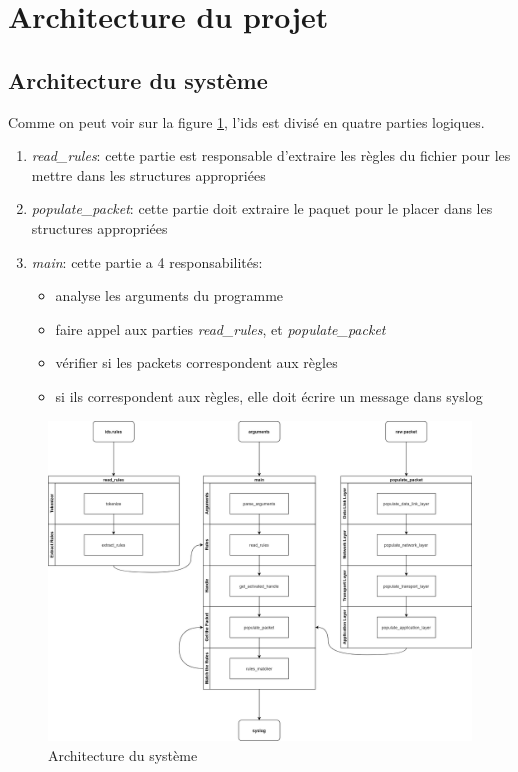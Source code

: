 \documentclass[a4paper]{article}
\begin{document}
\section{Architecture du projet}





\subsection{Architecture du système}



Comme on peut voir sur la figure \ref{fig:archsys}, l'ids est divisé en quatre parties logiques.
\begin{enumerate}
    \item \textit{read\_rules}: cette partie est responsable d'extraire les règles du fichier pour les mettre dans les structures appropriées
    \item \textit{populate\_packet}: cette partie doit extraire le paquet pour le placer dans les structures appropriées
    \item \textit{main}: cette partie a 4 responsabilités:
    \begin{itemize}
        \item analyse les arguments du programme
        \item faire appel aux parties \textit{read\_rules}, et \textit{populate\_packet}
        \item vérifier si les packets correspondent aux règles
        \item si ils correspondent aux règles, elle doit écrire un message dans syslog
    \end{itemize}
\end{enumerate}

\begin{figure}[H]
    \includegraphics[width=0.99\linewidth]{../markdown-explanations/images/software-architecture-2.png}
    \caption{Architecture du système}
    \label{fig:archsys}
\end{figure}
\end{document}
